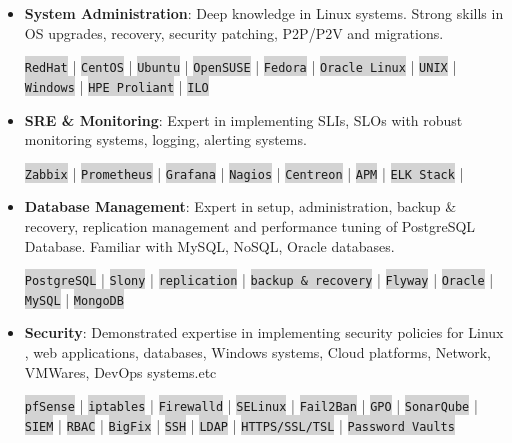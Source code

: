 \documentclass[11pt]{article}
\begin{document}
\begin{itemize}
		\item \textbf{System Administration}: Deep knowledge in Linux systems. Strong skills in OS upgrades, recovery, security patching, P2P/P2V and migrations.
		
		\colorbox{lightgrey}{\texttt{RedHat}} | \colorbox{lightgrey}{\texttt{CentOS}} | \colorbox{lightgrey}{\texttt{Ubuntu}} | \colorbox{lightgrey}{\texttt{OpenSUSE}} | \colorbox{lightgrey}{\texttt{Fedora}} | \colorbox{lightgrey}{\texttt{Oracle Linux}} | \colorbox{lightgrey}{\texttt{UNIX}} | \colorbox{lightgrey}{\texttt{Windows}} | \colorbox{lightgrey}{\texttt{HPE Proliant}} | \colorbox{lightgrey}{\texttt{ILO}}
		
		\item \textbf{SRE \& Monitoring}: Expert in implementing SLIs, SLOs with robust monitoring systems, logging, alerting systems.
		
		\colorbox{lightgrey}{\texttt{Zabbix}} | \colorbox{lightgrey}{\texttt{Prometheus}} | \colorbox{lightgrey}{\texttt{Grafana}} | \colorbox{lightgrey}{\texttt{Nagios}} | \colorbox{lightgrey}{\texttt{Centreon}} | \colorbox{lightgrey}{\texttt{APM}} |
		\colorbox{lightgrey}{\texttt{ELK Stack}} |
		
		
		\item \textbf{Database Management}: Expert in setup, administration, backup \& recovery, replication management and performance tuning of PostgreSQL Database. Familiar with MySQL, NoSQL, Oracle databases.
		
		\colorbox{lightgrey}{\texttt{PostgreSQL}} |  \colorbox{lightgrey}{\texttt{Slony}} | \colorbox{lightgrey}{\texttt{replication}} | \colorbox{lightgrey}{\texttt{backup \& recovery}} |
		\colorbox{lightgrey}{\texttt{Flyway}} |
		\colorbox{lightgrey}{\texttt{Oracle}} | \colorbox{lightgrey}{\texttt{MySQL}} |
		\colorbox{lightgrey}{\texttt{MongoDB}}
		
		\item \textbf{Security}: Demonstrated expertise in implementing security policies for Linux , web applications, databases, Windows systems, Cloud platforms, Network, VMWares, DevOps systems.etc
		
		\colorbox{lightgrey}{\texttt{pfSense}} | \colorbox{lightgrey}{\texttt{iptables}} | \colorbox{lightgrey}{\texttt{Firewalld}} |
		\colorbox{lightgrey}{\texttt{SELinux}} |
		\colorbox{lightgrey}{\texttt{Fail2Ban}} |
		\colorbox{lightgrey}{\texttt{GPO}} |
		\colorbox{lightgrey}{\texttt{SonarQube}} |
		\colorbox{lightgrey}{\texttt{SIEM}} | \colorbox{lightgrey}{\texttt{RBAC}} | \colorbox{lightgrey}{\texttt{BigFix}} | \colorbox{lightgrey}{\texttt{SSH}} | \colorbox{lightgrey}{\texttt{LDAP}} | \colorbox{lightgrey}{\texttt{HTTPS/SSL/TSL}} | \colorbox{lightgrey}{\texttt{Password Vaults}}
		

\end{itemize}
\end{document}
